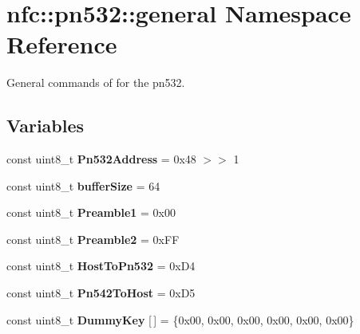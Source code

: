 \hypertarget{namespacenfc_1_1pn532_1_1general}{}\section{nfc\+:\+:pn532\+:\+:general Namespace Reference}
\label{namespacenfc_1_1pn532_1_1general}


General commands of for the pn532.  


\subsection*{Variables}
\begin{DoxyCompactItemize}
\item 
\mbox{\label{namespacenfc_1_1pn532_1_1general_a797e9b369243da9544ccef93e9e5e7c1}} 
const uint8\+\_\+t {\bfseries Pn532\+Address} = 0x48 $>$$>$ 1
\item 
\mbox{\label{namespacenfc_1_1pn532_1_1general_afa4ef944e3885d3fd9aa3b7c1ac7ad4f}} 
const uint8\+\_\+t {\bfseries buffer\+Size} = 64
\item 
\mbox{\label{namespacenfc_1_1pn532_1_1general_addb970167fd15a09b4a0019dbb82534f}} 
const uint8\+\_\+t {\bfseries Preamble1} = 0x00
\item 
\mbox{\label{namespacenfc_1_1pn532_1_1general_abceb1bc6e278d5605781176ad5f1ce35}} 
const uint8\+\_\+t {\bfseries Preamble2} = 0x\+FF
\item 
\mbox{\label{namespacenfc_1_1pn532_1_1general_a42f8474a886617fac6a160a25130d448}} 
const uint8\+\_\+t {\bfseries Host\+To\+Pn532} = 0x\+D4
\item 
\mbox{\label{namespacenfc_1_1pn532_1_1general_ad335e65d06d9369f91c45c9a91e8cae5}} 
const uint8\+\_\+t {\bfseries Pn542\+To\+Host} = 0x\+D5
\item 
\mbox{\label{namespacenfc_1_1pn532_1_1general_af61cf21682e68c4e2bdfa361dd063115}} 
const uint8\+\_\+t {\bfseries Dummy\+Key} \mbox{[}$\,$\mbox{]} = \{0x00, 0x00, 0x00, 0x00, 0x00, 0x00\}
$$
\end{DoxyCompactItemize}
